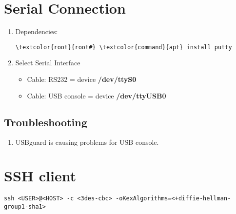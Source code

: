 \documentclass[10pt, a4paper, onecolumn, openany]{book} %
\begin{document}
\section{Serial Connection}
\begin{enumerate}
    \item Dependencies:
\begin{Verbatim}[commandchars=\\\{\}]
\textcolor{root}{root#} \textcolor{command}{apt} install putty
\end{Verbatim}
    \item Select Serial Interface
\begin{itemize}
    \item Cable: RS232 = device \textbf{/dev/ttyS0}
    \item Cable: USB console = device \textbf{/dev/ttyUSB0}
\end{itemize}
\end{enumerate}
\subsection{Troubleshooting}
\begin{enumerate}
    \item USBguard is causing problems for USB console.
\end{enumerate}
\section{SSH client}
\begin{Verbatim}[commandchars=\\\{\}]
ssh <USER>@<HOST> -c <3des-cbc> -oKexAlgorithms=<+diffie-hellman-group1-sha1>
\end{Verbatim}
\end{document}
